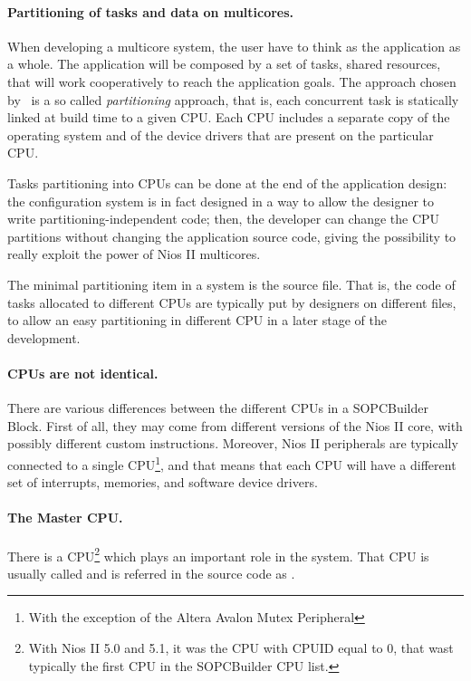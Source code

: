 \paragraph{Partitioning of tasks and data on multicores.}
When developing a multicore system, the user have to think as the
application as a whole. The application will be composed by a set of
tasks, shared resources, that will work cooperatively to reach the
application goals. The approach chosen by \ee\ is a so
called {\em partitioning} approach, that is, each concurrent task is
statically linked at build time to a given CPU. Each CPU includes a
separate copy of the operating system and of the device drivers that
are present on the particular CPU.

Tasks partitioning into CPUs can be done at the end of the application
design: the configuration system is in fact designed in a way to allow
the designer to write partitioning-independent code; then, the
developer can change the CPU partitions without changing the
application source code, giving the possibility to really exploit the
power of Nios II multicores.

The minimal partitioning item in a system is the source file. That is,
the code of tasks allocated to different CPUs are typically put by
designers on different files, to allow an easy partitioning in
different CPU in a later stage of the development.

\paragraph{CPUs are not identical.}
There are various differences between the different CPUs in a
SOPCBuilder Block. First of all, they may come from different versions
of the Nios II core, with possibly different custom
instructions. Moreover, Nios II peripherals are typically connected to
a single CPU\footnote{With the exception of the Altera Avalon Mutex
Peripheral}, and that means that each CPU will have a different set of
interrupts, memories, and software device drivers.

\paragraph{The Master CPU.} 
There is a CPU\footnote{With Nios II 5.0 and 5.1, it was the CPU with
CPUID equal to 0, that wast typically the first CPU in the SOPCBuilder
CPU list.} which plays an important role in the system. That CPU is
usually called {\em {}} and is referred in the source
code as .

